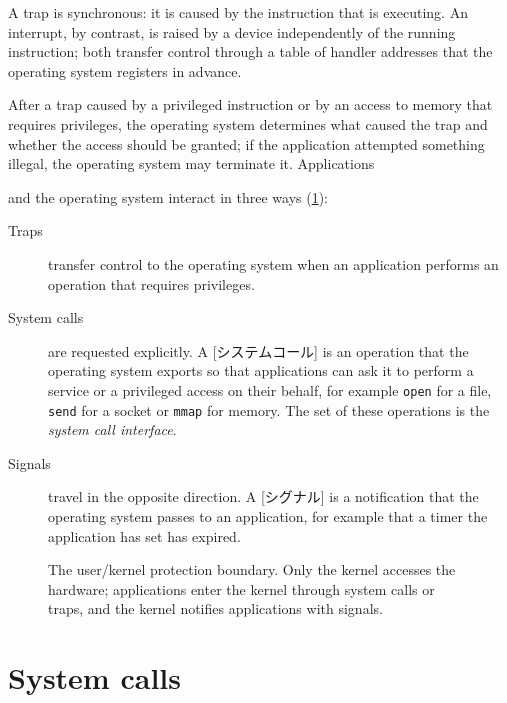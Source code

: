 \documentclass[../main.tex]{subfiles}
\begin{document}
A trap is synchronous: it is caused by the instruction that is
executing.  An interrupt, by contrast, is raised by a device
independently of the running instruction; both transfer control through a
table of handler addresses that the operating system registers in advance.

After a trap caused by a privileged instruction or by an access to memory
that requires privileges, the operating system determines what caused the
trap and whether the access should be granted; if the application attempted
something illegal, the operating system may terminate it.  Applications

and the operating system interact in three ways (\cref{fig:l01-user-kernel}):
\begin{description}
  \item[Traps] transfer control to the operating system when an
    application performs an operation that requires privileges.
  \item[System calls] are requested explicitly.  A
    [システムコール] is an operation that the operating
    system exports so that applications can ask it to perform a service or
    a privileged access on their behalf, for example \texttt{open} for a
    file, \texttt{send} for a socket or \texttt{mmap} for memory.  The set
    of these operations is the \emph{system call interface}.
  \item[Signals] travel in the opposite direction.  A
    [シグナル] is a notification that the operating system
    passes to an application, for example that a timer the application
    has set has expired.
\end{description}

\begin{figure}[htbp]
  \centering
  
  \caption{The user/kernel protection boundary.  Only the kernel accesses
    the hardware; applications enter the kernel through system calls or
    traps, and the kernel notifies applications with signals.}
  \label{fig:l01-user-kernel}
\end{figure}

\section{System calls}
\label{sec:l01-syscalls}
\end{document}
